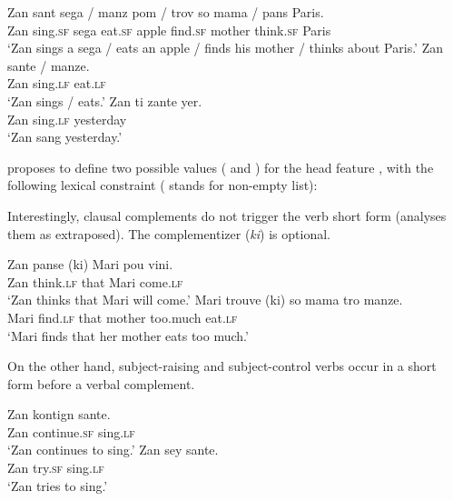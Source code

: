 \begin{exe}
\ex \begin{xlist}
\ex 
\gll Zan sant sega / manz pom / trov so mama / pans Paris. \\
     Zan sing.\textsc{sf} sega {} eat.\textsc{sf} apple {} find.\textsc{sf} \POSS{} mother {} think.\textsc{sf} Paris \\
\glt `Zan sings a sega / eats an apple / finds his mother / thinks about Paris.'	
\ex 
\gll Zan sante / manze.\\
     Zan sing.\textsc{lf} {} eat.\textsc{lf}\\
\glt `Zan sings / eats.'
\ex 
\gll Zan ti zante yer. \\
Zan  \PRF{} sing.\textsc{lf} yesterday\\
\glt `Zan sang yesterday.'
\end{xlist}
\end{exe}


\citet{Henri2010} proposes to define two possible values ( and ) for the head
feature \vform, with the following lexical constraint ( stands for non-empty list):

\begin{exe}       
\ex
{}
\end{exe}
Interestingly, clausal complements do not trigger the verb short form (\citet{Henri2010}\addpages analyses them as extraposed). The complementizer (\emph{ki}) is optional.

\eal
\ex 
\gll Zan panse             (ki)               Mari pou    vini.\\
     Zan think.\textsc{lf} \hphantom{(}that Mari \FUT{} come.\textsc{lf}\\
\glt `Zan thinks that Mari will come.'
\ex 
\gll Mari trouve           (ki)                so      mama   tro      manze.\\
     Mari find.\textsc{lf} \hphantom{(}that  \POSS{} mother too.much eat.\textsc{lf}\\
\glt `Mari finds that her mother eats too much.'
\zl

On the other hand, subject-raising and subject-control verbs occur in a short form before a verbal complement.

\begin{exe}
\ex \begin{xlist}
\ex \gll Zan kontign sante.\\
Zan continue.\textsc{sf} sing.\textsc{lf}\\
\glt `Zan continues to sing.'
\ex \gll Zan sey sante.\\
Zan try.\textsc{sf} sing.\textsc{lf}\\
\glt `Zan tries to sing.'
\end{xlist}
\end{exe}

